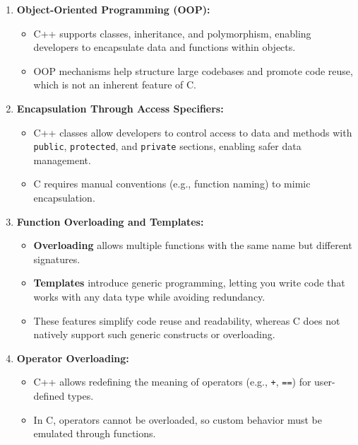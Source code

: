 \documentclass[a4paper,12pt]{article}
\begin{document}
\begin{enumerate}
    \item \textbf{Object-Oriented Programming (OOP):}
    \begin{itemize}
        \item C++ supports classes, inheritance, and polymorphism, enabling developers to encapsulate data and functions within objects. 
        \item OOP mechanisms help structure large codebases and promote code reuse, which is not an inherent feature of C.
    \end{itemize}
    
    \item \textbf{Encapsulation Through Access Specifiers:}
    \begin{itemize}
        \item C++ classes allow developers to control access to data and methods with \texttt{public}, \texttt{protected}, and \texttt{private} sections, enabling safer data management.
        \item C requires manual conventions (e.g., function naming) to mimic encapsulation.
    \end{itemize}
    
    \item \textbf{Function Overloading and Templates:}
    \begin{itemize}
        \item \textbf{Overloading} allows multiple functions with the same name but different signatures.
        \item \textbf{Templates} introduce generic programming, letting you write code that works with any data type while avoiding redundancy.
        \item These features simplify code reuse and readability, whereas C does not natively support such generic constructs or overloading.
    \end{itemize}
    
    \item \textbf{Operator Overloading:}
    \begin{itemize}
        \item C++ allows redefining the meaning of operators (e.g., \texttt{+}, \texttt{==}) for user-defined types.
        \item In C, operators cannot be overloaded, so custom behavior must be emulated through functions.
    \end{itemize}
    

\end{enumerate}
\end{document}

